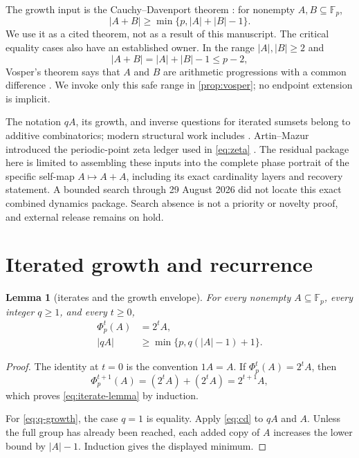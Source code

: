 \documentclass[11pt,a4paper]{amsart}
\newtheorem{lemma}[theorem]{Lemma}
\theoremstyle{definition}
\theoremstyle{remark}
\newcommand{\Fp}{\mathbb F_p}
\newcommand{\card}[1]{\lvert #1\rvert}
\begin{document}
The growth input is the Cauchy--Davenport theorem
\cite{Davenport1935,TaoVu2006}: for nonempty $A,B\subseteq\Fp$,
\begin{equation}\label{eq:cd}
 \card{A+B}\geq\min\{p,\card A+\card B-1\}.
\end{equation}
We use it as a cited theorem, not as a result of this manuscript.  The
critical equality cases also have an established owner.  In the range
$\card A,\card B\geq2$ and
\[
 \card{A+B}=\card A+\card B-1\leq p-2,
\]
Vosper's theorem says that $A$ and $B$ are arithmetic progressions with a
common difference \cite{Vosper1956,TaoVu2006}.  We invoke only this safe
range in \cref{prop:vosper}; no endpoint extension is implicit.

The notation $qA$, its growth, and inverse questions for iterated sumsets
belong to additive combinatorics; modern structural work includes
\cite{Grynkiewicz2020}.  Artin--Mazur introduced the periodic-point zeta
ledger used in \eqref{eq:zeta} \cite{ArtinMazur1965}.  The residual package
here is limited to assembling these inputs into the complete phase portrait
of the specific self-map $A\mapsto A+A$, including its exact cardinality
layers and recovery statement.  A bounded search through 29 August 2026 did
not locate this exact combined dynamics package.  Search absence is not a
priority or novelty proof, and external release remains on hold.

\section{Iterated growth and recurrence}\label{sec:growth}

\begin{lemma}[iterates and the growth envelope]\label{lem:growth}
For every nonempty $A\subseteq\Fp$, every integer $q\geq1$, and every
$t\geq0$,
\begin{align}
 \Phi_p^t(A)&=2^tA,\label{eq:iterate-lemma}\\
 \card{qA}&\geq\min\{p,q(\card A-1)+1\}.\label{eq:q-growth}
\end{align}
\end{lemma}

\begin{proof}
The identity at $t=0$ is the convention $1A=A$.  If
$\Phi_p^t(A)=2^tA$, then
\[
 \Phi_p^{t+1}(A)=(2^tA)+(2^tA)=2^{t+1}A,
\]
which proves \eqref{eq:iterate-lemma} by induction.

For \eqref{eq:q-growth}, the case $q=1$ is equality.  Apply
\eqref{eq:cd} to $qA$ and $A$.  Unless the full group has already been
reached, each added copy of $A$ increases the lower bound by
$\card A-1$.  Induction gives the displayed minimum.
\end{proof}
\end{document}
